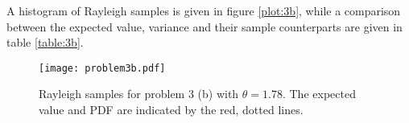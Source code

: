 \documentclass[a4paper,english,12pt]{article}
\begin{document}
A histogram of Rayleigh samples is given in figure \vref{plot:3b}, while a
comparison between the expected value, variance and their sample counterparts
are given in table \vref{table:3b}.



\begin{figure}
  \centering
  \texttt{[image: problem3b.pdf]}
  \caption{Rayleigh samples for problem 3 (b) with $\theta=1.78$. The expected
  value and PDF are indicated by the red, dotted lines.}
  \label{plot:3b}
\end{figure}




\end{document}
